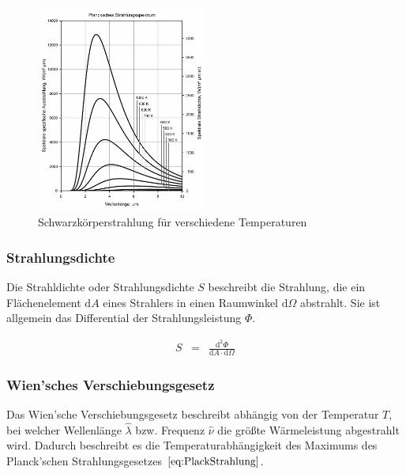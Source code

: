 \documentclass[12pt,a4paper]{scrartcl}
\numberwithin{equation}{section} %
\renewcommand{\[}{} %
\renewcommand{\]}{\noindent} %
\begin{document}
\begin{figure}[h!]
	\centering
	\includegraphics[width=0.5\textwidth]{../media/B1.1/BlackbodySpectrum_lin_150dpi_de.png}
	\caption{Schwarzkörperstrahlung für verschiedene Temperaturen \cite{abb:SpektrumSK}}
	\label{abb:SpektrumSK}
\end{figure}

\hypertarget{strahlungsdichte}{%
\subsubsection{Strahlungsdichte}\label{strahlungsdichte}}

Die Strahldichte oder Strahlungsdichte \(S\) beschreibt die Strahlung, die ein Flächenelement \(\mathrm dA\) eines Strahlers in einen Raumwinkel \(\mathrm d\Omega\) abstrahlt. Sie ist allgemein das Differential der Strahlungsleistung \(\Phi\). \cite{Demtröder,Strahldichte}

\[
\begin{eqnarray}
    S &=& \frac{\mathrm d^2\Phi}{\mathrm dA \cdot \mathrm d\Omega}
\end{eqnarray}
\]

\hypertarget{wiensches-verschiebungsgesetz}{%
\subsubsection{Wien'sches
Verschiebungsgesetz}\label{wiensches-verschiebungsgesetz}}

Das Wien'sche Verschiebungsgesetz beschreibt abhängig von der Temperatur \(T\), bei welcher Wellenlänge \(\hat{\lambda}\) bzw. Frequenz \(\hat{\nu}\) die größte Wärmeleistung abgestrahlt wird. Dadurch beschreibt es die Temperaturabhängigkeit des Maximums des Planck'schen Strahlungsgesetzes \(\eqref{eq:PlackStrahlung}\).
\end{document}
